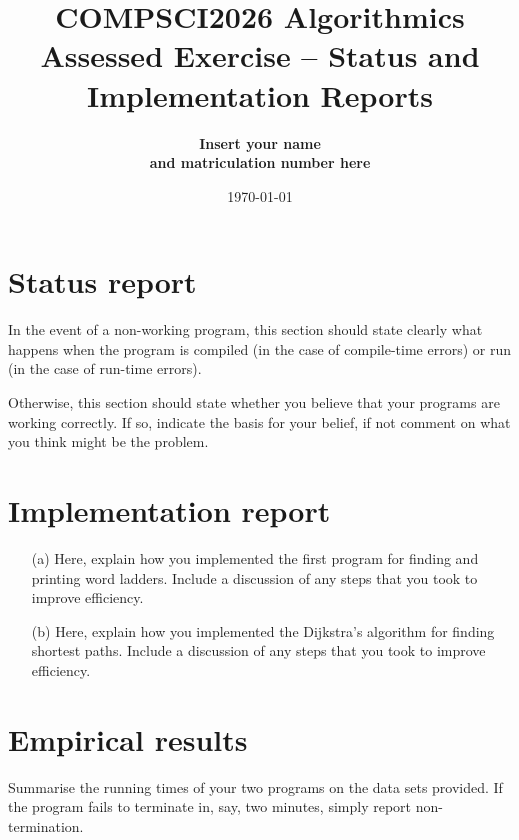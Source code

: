 \documentclass{article}
\title{COMPSCI2026 Algorithmics \\ \vspace{4mm} 
 Assessed Exercise -- Status and Implementation Reports}
\author{\bf Insert your name\\ \bf and matriculation number here}
\date{\today}
\begin{document}
 
\maketitle

\section*{Status report}

In the event of a non-working program, this section should state clearly what happens when the program is compiled (in the case of compile-time errors) or run (in the case of run-time errors).  

Otherwise, this section should state whether you believe that your programs are working correctly. If so, indicate the basis for your belief, if not comment on what you think might be the problem.

\section*{Implementation report}

\begin{itemize}
\item[(a)] 
Here, explain how you implemented the first program for finding and printing word ladders. Include a discussion of any steps that you took to improve efficiency.
\item[(b)]
Here, explain how you implemented the Dijkstra’s algorithm for finding shortest paths. Include a discussion of any steps that you took to improve efficiency.
\end{itemize}

\section*{Empirical results}

Summarise the running times of your two programs on the data sets provided. If the program fails to terminate in, say, two minutes, simply report non-termination. 
\end{document}

